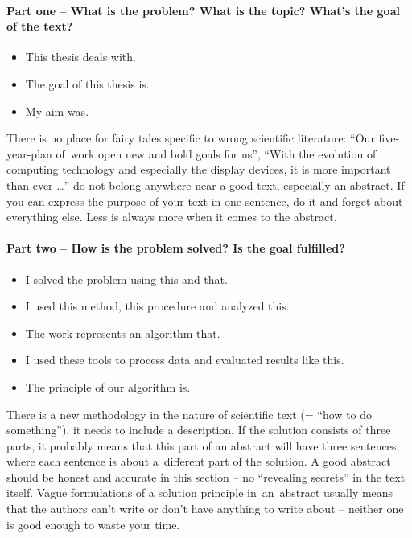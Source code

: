 \paragraph{Part one -- What is the problem? What is the topic? What's the goal of the text?}
\begin{itemize}
  \item{This thesis deals with.}
  \item{The goal of this thesis is.}
  \item{My aim was.}
\end{itemize}
There is no place for fairy tales specific to wrong scientific literature: ``Our five-year-plan of~work open new and bold goals for us'', ``With the evolution of computing technology and especially the display devices, it is more important than ever \ldots'' do not belong anywhere near a good text, especially an abstract. If you can express the purpose of your text in one sentence, do it and forget about everything else. Less is always more when it comes to the abstract.

\paragraph{Part two -- How is the problem solved? Is the goal fulfilled?}
\begin{itemize}
  \item{I solved the problem using this and that.}
  \item{I used this method, this procedure and analyzed this.}
  \item{The work represents an algorithm that.}
  \item{I used these tools to process data and evaluated results like this.}
  \item{The principle of our algorithm is.}
\end{itemize}

There is a new methodology in the nature of scientific text (= ``how to do something''), it needs to include a description. If the solution consists of three parts, it probably means that this part of an abstract will have three sentences, where each sentence is about a~different part of the solution. A good abstract should be honest and accurate in this section -- no ``revealing secrets'' in the text itself. Vague formulations of a solution principle in~an~abstract usually means that the authors can't write or don't have anything to write about -- neither one is good enough to waste your time.

